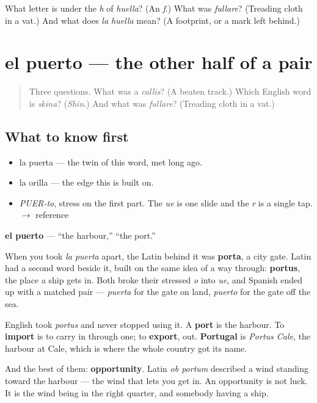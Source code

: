 \begin{tcolorbox}[breakable,colback=teal!4,colframe=teal!35!black,title={Before you move on}]
What letter is under the \emph{h} of \emph{huella}? (An \emph{f}.) What was \emph{fullare}? (Treading cloth in a vat.) And what does \emph{la huella} mean? (A footprint, or a mark left behind.)
\end{tcolorbox}
\section[el puerto]{el puerto — the other half of a pair}

\label{lesson:ES-C302-puerto}



\begin{quote}
Three questions. What was a \emph{callis}? (A beaten track.) Which English word is \emph{skina}? (\emph{Shin}.) And what was \emph{fullare}? (Treading cloth in a vat.)
\end{quote}

\subsection*{What to know first}
\begin{itemize}
\raggedright
  \item la puerta — the twin of this word, met long ago.
  \item la orilla — the edge this is built on.
\end{itemize}

\begin{sounds}
\begin{itemize}
\raggedright
  \item \emph{PUER-to}, stress on the first part. The \emph{ue} is one slide and the \emph{r} is a single tap. $\to$ reference
\end{itemize}
\end{sounds}

\begin{cousinweb}
\textbf{el puerto} — \textquotedblleft{}the harbour,\textquotedblright{} \textquotedblleft{}the port.\textquotedblright{}

When you took \emph{la puerta} apart, the Latin behind it was \textbf{porta}, a city gate. Latin had a second word beside it, built on the same idea of a way through: \textbf{portus}, the place a ship gets in. Both broke their stressed \emph{o} into \emph{ue}, and Spanish ended up with a matched pair — \emph{puerta} for the gate on land, \emph{puerto} for the gate off the sea.

English took \emph{portus} and never stopped using it. A \textbf{port} is the harbour. To \textbf{import} is to carry in through one; to \textbf{export}, out. \textbf{Portugal} is \emph{Portus Cale}, the harbour at Cale, which is where the whole country got its name.

And the best of them: \textbf{opportunity}. Latin \emph{ob portum} described a wind standing toward the harbour — the wind that lets you get in. An opportunity is not luck. It is the wind being in the right quarter, and somebody having a ship.
\end{cousinweb}

